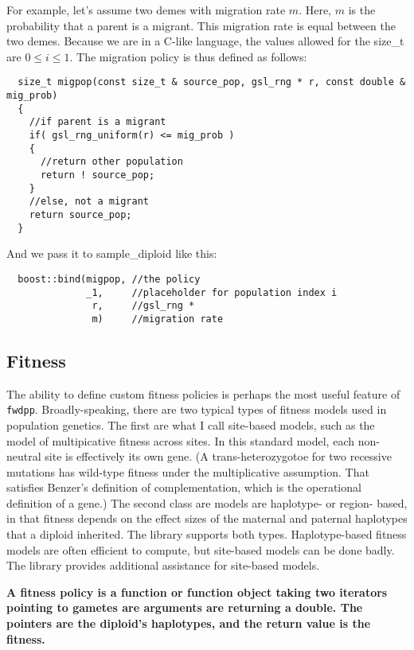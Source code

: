 \documentclass{article}
\begin{document}
For example, let's assume two demes with migration rate $m$.  Here, $m$ is the probability that a parent is a migrant. This migration rate is equal between the two demes.  Because we are in a C-like language, the values allowed for the size\_t are $0 \leq i \leq 1$.  The migration policy is thus defined as follows:

\begin{lstlisting}
  size_t migpop(const size_t & source_pop, gsl_rng * r, const double & mig_prob)
  {
    //if parent is a migrant
    if( gsl_rng_uniform(r) <= mig_prob )
    {
      //return other population
      return ! source_pop;
    }
    //else, not a migrant
    return source_pop;
  }
\end{lstlisting}

And we pass it to sample\_diploid like this:
\begin{lstlisting}
  boost::bind(migpop, //the policy
              _1,     //placeholder for population index i
               r,     //gsl_rng *
               m)     //migration rate
\end{lstlisting}
\subsection{Fitness}
The ability to define custom fitness policies is perhaps the most useful feature of \texttt{fwdpp}.  Broadly-speaking, there are two typical types of fitness models used in population genetics.  The first are what I call site-based models, such as the model of multipicative fitness across sites.  In this standard model, each non-neutral site is effectively its own gene. (A trans-heterozygotoe for two recessive mutations has wild-type fitness under the multiplicative assumption. That satisfies Benzer's definition of complementation, which is the operational definition of a gene.)  The second class are models are haplotype- or region- based, in that fitness depends on the effect sizes of the maternal and paternal haplotypes that a diploid inherited.  The library supports both types.  Haplotype-based fitness models are often efficient to compute, but site-based models can be done badly.  The library provides additional assistance for site-based models.

\textbf{A fitness policy is a function or function object taking two iterators pointing to gametes are arguments are returning a double.  The pointers are the diploid's haplotypes, and the return value is the fitness.}
\end{document}
